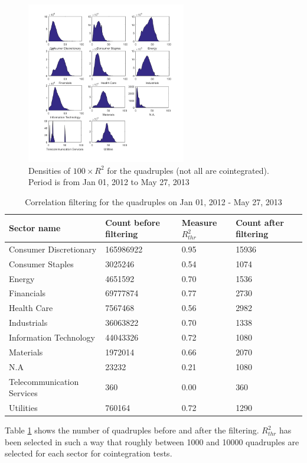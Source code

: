 \documentclass[11pt,a4,twosided,singlespacing,titlepagenumber=on]{scrreprt}
\numberwithin{equation}{chapter} %
\theoremstyle{remark}
\begin{document}
\begin{figure}[H]
\centering
\includegraphics[width = 0.62\textwidth]{R2_ret_Quads_Jan_1_2012_Mar_27_2013}
\caption{Densities of $100 \times R^2$ for the quadruples (not all are cointegrated). Period is from Jan 01, 2012 to May 27, 2013}
\label{dist_100_r2_quad}
\end{figure}

\begin{table}[H]
\centering
\begin{tabular}{llll}
\hline
\multicolumn{1}{|l|}{Sector name}     & \multicolumn{1}{|l|}{Count before filtering} & \multicolumn{1}{|l|}{Measure $R_{thr}^2$} & \multicolumn{1}{l|}{Count after filtering} \\ \hline
Consumer Discretionary						 &  165986922 & 0.95 & 15936 \\
Consumer Staples                   &  3025246 & 0.54 & 1074\\
Energy                             &  4651592 & 0.70 & 1536\\
Financials                         &  69777874 & 0.77 & 2730\\
Health Care                        &  7567468 & 0.56 & 2982\\
Industrials                        &  36063822 & 0.70 & 1338\\
Information Technology             & 44043326 & 0.72 & 1080\\
Materials                          & 1972014 & 0.66 & 2070\\
N.A                                & 23232 & 0.21 & 1080\\
Telecommunication Services         & 360 & 0.00 & 360\\
Utilities                          & 760164 & 0.72 & 1290\\
\hline
\end{tabular}
\caption{Correlation filtering for the quadruples on Jan 01, 2012 - May 27, 2013}
\label{corr_quad}
\end{table}
Table \ref{corr_quad} shows the number of quadruples before and after the filtering. $R^2_{thr}$ has been selected in such a way that roughly between 1000 and 10000 quadruples are selected for each sector for cointegration tests.
\end{document}
